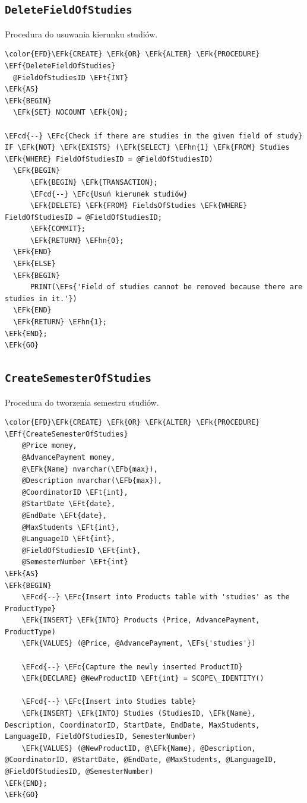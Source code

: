 \documentclass[11pt]{article}
\newcommand{\EFc}[1]{\textcolor{EFc}{\textit{#1}}} %
\newcommand{\EFcd}[1]{\textcolor{EFcd}{\textit{#1}}} %
\newcommand{\EFs}[1]{\textcolor{EFs}{#1}} %
\newcommand{\EFk}[1]{\textcolor{EFk}{\textbf{#1}}} %
\newcommand{\EFb}[1]{\textcolor{EFb}{\textbf{#1}}} %
\newcommand{\EFf}[1]{\textcolor{EFf}{#1}} %
\newcommand{\EFt}[1]{\textcolor{EFt}{\textbf{#1}}} %
\newcommand{\EFhn}[1]{\textcolor{EFhn}{#1}} %
\begin{document}
\subsection{\texttt{DeleteFieldOfStudies}}
\label{sec:org1d6f4f0}
Procedura do usuwania kierunku studiów.
\begin{Code}
\begin{Verbatim}
\color{EFD}\EFk{CREATE} \EFk{OR} \EFk{ALTER} \EFk{PROCEDURE} \EFf{DeleteFieldOfStudies}
  @FieldOfStudiesID \EFt{INT}
\EFk{AS}
\EFk{BEGIN}
  \EFk{SET} NOCOUNT \EFk{ON};

\EFcd{--} \EFc{Check if there are studies in the given field of study}
IF \EFk{NOT} \EFk{EXISTS} (\EFk{SELECT} \EFhn{1} \EFk{FROM} Studies \EFk{WHERE} FieldOfStudiesID = @FieldOfStudiesID)
  \EFk{BEGIN}
      \EFk{BEGIN} \EFk{TRANSACTION};
      \EFcd{--} \EFc{Usuń kierunek studiów}
      \EFk{DELETE} \EFk{FROM} FieldsOfStudies \EFk{WHERE} FieldOfStudiesID = @FieldOfStudiesID;
      \EFk{COMMIT};
      \EFk{RETURN} \EFhn{0};
  \EFk{END}
  \EFk{ELSE}
  \EFk{BEGIN}
      PRINT(\EFs{'Field of studies cannot be removed because there are studies in it.'})
  \EFk{END}
  \EFk{RETURN} \EFhn{1};
\EFk{END};
\EFk{GO}
\end{Verbatim}
\end{Code}
\subsection{\texttt{CreateSemesterOfStudies}}
\label{sec:orgcca0c92}
Procedura do tworzenia semestru studiów.
\begin{Code}
\begin{Verbatim}
\color{EFD}\EFk{CREATE} \EFk{OR} \EFk{ALTER} \EFk{PROCEDURE} \EFf{CreateSemesterOfStudies}
    @Price money,
    @AdvancePayment money,
    @\EFk{Name} nvarchar(\EFb{max}),
    @Description nvarchar(\EFb{max}),
    @CoordinatorID \EFt{int},
    @StartDate \EFt{date},
    @EndDate \EFt{date},
    @MaxStudents \EFt{int},
    @LanguageID \EFt{int},
    @FieldOfStudiesID \EFt{int},
    @SemesterNumber \EFt{int}
\EFk{AS}
\EFk{BEGIN}
    \EFcd{--} \EFc{Insert into Products table with 'studies' as the ProductType}
    \EFk{INSERT} \EFk{INTO} Products (Price, AdvancePayment, ProductType)
    \EFk{VALUES} (@Price, @AdvancePayment, \EFs{'studies'})

    \EFcd{--} \EFc{Capture the newly inserted ProductID}
    \EFk{DECLARE} @NewProductID \EFt{int} = SCOPE\_IDENTITY()

    \EFcd{--} \EFc{Insert into Studies table}
    \EFk{INSERT} \EFk{INTO} Studies (StudiesID, \EFk{Name}, Description, CoordinatorID, StartDate, EndDate, MaxStudents, LanguageID, FieldOfStudiesID, SemesterNumber)
    \EFk{VALUES} (@NewProductID, @\EFk{Name}, @Description, @CoordinatorID, @StartDate, @EndDate, @MaxStudents, @LanguageID, @FieldOfStudiesID, @SemesterNumber)
\EFk{END};
\EFk{GO}
\end{Verbatim}
\end{Code}
\end{document}
